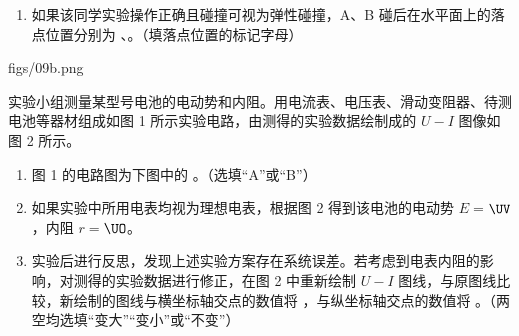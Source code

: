 \documentclass[\gkver]{gaokaozhenti}
\begin{document}
\begin{enumerate}
\begin{enumerate}
	A．斜槽的末端必须是水平的

	B．斜槽的轨道必须是光滑的

	C．必须测出斜槽末端的高度

	D．A、B 的质量必须相同
	\item
	如果该同学实验操作正确且碰撞可视为弹性碰撞，A、B 碰后在水平面上的落点位置分别为 、。（填落点位置的标记字母）
\end{enumerate}
{figs/09b.png}

实验小组测量某型号电池的电动势和内阻。用电流表、电压表、滑动变阻器、待测电池等器材组成如图 1 所示实验电路，由测得的实验数据绘制成的 $U - I$ 图像如图 2 所示。

\begin{enumerate}[resume]
	\item
	图 1 的电路图为下图中的 。（选填“A”或“B”）
	\item
	如果实验中所用电表均视为理想电表，根据图 2 得到该电池的电动势 $E = $$\UV$，内阻 $r = $$\UO$。
	\item
	实验后进行反思，发现上述实验方案存在系统误差。若考虑到电表内阻的影响，对测得的实验数据进行修正，在图 2 中重新绘制 $U - I$ 图线，与原图线比较，新绘制的图线与横坐标轴交点的数值将 ，与纵坐标轴交点的数值将 。（两空均选填“变大”“变小”或“不变”）
\end{enumerate}
\end{enumerate}
\end{document}
